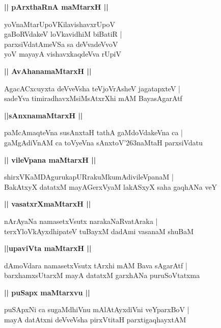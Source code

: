 \documentclass[twoside,12pt,openright]{book}
\def\S{\char'263}
\newcounter{shloka}[chapter]
\def\uvaca#1{\centerline{{\large\textbf{#1}}}}
\begin{document}
\uvaca{ || pArxthaRnA maMtarxH ||}

\begin{shloka}%
yoVnaMtarUpoVKilavishavxrUpoV\\
gaBoRVdakeV loVkavidhiM biBatiR |\\
parxsiVdatAmeVSa sa deVvadeVvoV \\
yoV mayayA vishavxkaqdeVva rUpiV
\end{shloka}

\uvaca{|| AvAhanamaMtarxH ||}

\begin{shloka}%
AgacACxcuyxta deVveVsha teVjoVrAsheV jagatapxteV |\\
sadeYva timiradhavxMsiMsAtxrXhi mAM BayasAgarAtf
\end{shloka}

\uvaca{||sAnxnamaMtarxH ||}

\begin{shloka}%
paMcAmaqteVna susAnxtaH tathA gaMdoVdakeVna ca |\\
gaMgAdiVnAM ca toVyeVna sAnxtoV\S naMtaH parxsiVdatu
\end{shloka}

\uvaca{|| vileVpana maMtarxH ||}

\begin{shloka}%
shirxVKaMDAgurukapURrakuMkumAdivileVpanaM |\\
BakAtxyX datatxM mayAGerxVyaM lakASxyX saha gaqhANa veY
\end{shloka}

\uvaca{|| vasatxrXmaMtarxH ||}

\begin{shloka}%
nArAyaNa namasetxVsutx narakaNaRvatAraka |\\
terxYloVkAyxdhipateV tuBayxM dadAmi vasanaM shuBaM 
\end{shloka}

\uvaca{||upaviVta maMtarxH ||}

\begin{shloka}%
dAmoVdara namasetxVsutx tArxhi mAM Bava sAgarAtf |\\
barxhamxsUtarxM mayA datatxM garxhANa puruSoVtatxma
\end{shloka}

\uvaca{|| puSapx maMtarxvu ||}

\begin{shloka}%
puSApxNi ca sugaMdhiVnu mAlAtAyxdiVni veYparxBoV |\\
mayA datAtxni deVveVsha pirxVtitaH parxtigaqhayxtAM
\end{shloka}
\end{document}
